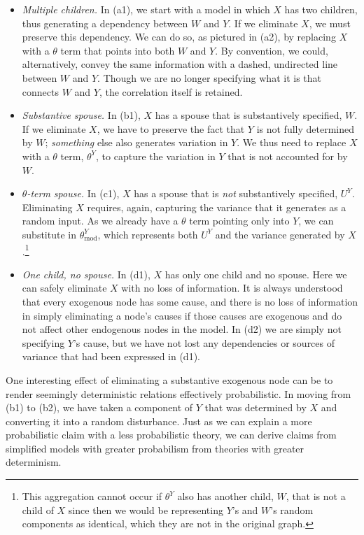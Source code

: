 \documentclass[
  12pt,
]{book}
\providecommand{\tightlist}{%
  \setlength{\itemsep}{0pt}\setlength{\parskip}{0pt}}
\begin{document}
\begin{itemize}
\tightlist
\item
  \emph{Multiple children.} In (a1), we start with a model in which \(X\) has two children, thus generating a dependency between \(W\) and \(Y\). If we eliminate \(X\), we must preserve this dependency. We can do so, as pictured in (a2), by replacing \(X\) with a \(\theta\) term that points into both \(W\) and \(Y\). By convention, we could, alternatively, convey the same information with a dashed, undirected line between \(W\) and \(Y\). Though we are no longer specifying what it is that connects \(W\) and \(Y\), the correlation itself is retained.
\item
  \emph{Substantive spouse.} In (b1), \(X\) has a spouse that is substantively specified, \(W\). If we eliminate \(X\), we have to preserve the fact that \(Y\) is not fully determined by \(W\); \emph{something} else also generates variation in \(Y\). We thus need to replace \(X\) with a \(\theta\) term, \(\theta^Y\), to capture the variation in \(Y\) that is not accounted for by \(W\).
\item
  \emph{\(\theta\)-term spouse.} In (c1), \(X\) has a spouse that is \emph{not} substantively specified, \(U^{Y}\). Eliminating \(X\) requires, again, capturing the variance that it generates as a random input. As we already have a \(\theta\) term pointing only into \(Y\), we can substitute in \(\theta^{Y}_\text{mod}\), which represents both \(U^{Y}\) and the variance generated by \(X\).\footnote{This aggregation cannot occur if \(\theta^{Y}\) also has another child, \(W\), that is not a child of \(X\) since then we would be representing \(Y\)'s and \(W\)'s random components as identical, which they are not in the original graph.}
\item
  \emph{One child, no spouse.} In (d1), \(X\) has only one child and no spouse. Here we can safely eliminate \(X\) with no loss of information. It is always understood that every exogenous node has some cause, and there is no loss of information in simply eliminating a node's causes if those causes are exogenous and do not affect other endogenous nodes in the model. In (d2) we are simply not specifying \(Y\)'s cause, but we have not lost any dependencies or sources of variance that had been expressed in (d1).
\end{itemize}

One interesting effect of eliminating a substantive exogenous node can be to render seemingly deterministic relations effectively probabilistic. In moving from (b1) to (b2), we have taken a component of \(Y\) that was determined by \(X\) and converting it into a random disturbance. Just as we can explain a more probabilistic claim with a less probabilistic theory, we can derive claims from simplified models with greater probabilism from theories with greater determinism.
\end{document}
